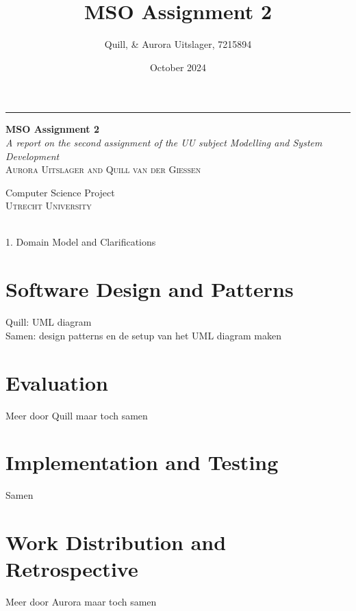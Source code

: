 \documentclass[a4paper, 11pt, oneside]{book} %
\title{MSO Assignment 2}
\author{Quill, \& Aurora Uitslager, 7215894}
\date{October 2024}
\begin{document}
\begin{titlepage} %
	
	\raggedleft %
	
	\rule{1pt}{\textheight} %
	\hspace{0.05\textwidth} %
	\parbox[b]{0.75\textwidth}{ %
		
		{\Huge \bfseries MSO Assignment 2}\\[2\baselineskip] %
		{\large\textit{A report on the second assignment of the UU subject Modelling and System Development}}\\[4\baselineskip] %
		{\Large\textsc{Aurora Uitslager and Quill van der Giessen}} %
		
		\vspace{0.5\textheight} %
		
		{\noindent \small Computer Science Project \\ \large \textsc{Utrecht University}~~\\}\\[\baselineskip] %
	}

\end{titlepage}

{1. Domain Model and Clarifications}

\section{Software Design and Patterns}
Quill: UML diagram\\
Samen: design patterns en de setup van het UML diagram maken

\section{Evaluation}
Meer door Quill maar toch samen

\section{Implementation and Testing}
Samen

\section{Work Distribution and Retrospective}
Meer door Aurora maar toch samen
\end{document}
